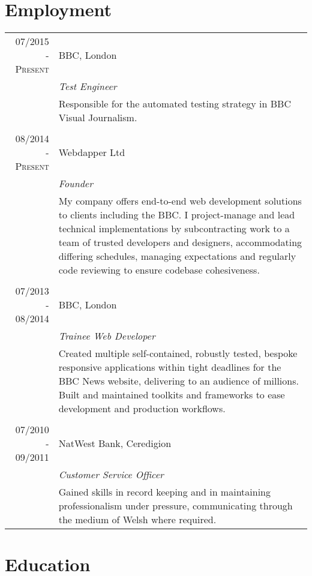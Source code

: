 \documentclass[a4paper,10pt]{article}
\begin{document}
\section{Employment}
\begin{tabular}{r|p{11cm}}
\textsc{07/2015 - Present} & BBC, London
\\&\emph{Test Engineer}
\\&\footnotesize{Responsible for the automated testing strategy in BBC Visual Journalism.}
\\\multicolumn{2}{c}{} \\
\textsc{08/2014 - Present} & Webdapper Ltd
\\&\emph{Founder}
\\&\footnotesize{My company offers end-to-end web development solutions to clients including the BBC. I project-manage and lead technical implementations by subcontracting work to a team of trusted developers and designers, accommodating differing schedules, managing expectations and regularly code reviewing to ensure codebase cohesiveness.}
\\\multicolumn{2}{c}{} \\
\textsc{07/2013 - 08/2014} & BBC, London
\\&\emph{Trainee Web Developer}
\\&\footnotesize{Created multiple self-contained, robustly tested, bespoke responsive applications within tight deadlines for the BBC News website, delivering to an audience of millions. Built and maintained toolkits and frameworks to ease development and production workflows.}
\\\multicolumn{2}{c}{} \\
\textsc{07/2010 - 09/2011} & NatWest Bank, Ceredigion
\\&\emph{Customer Service Officer}
\\&\footnotesize{Gained skills in record keeping and in maintaining professionalism under pressure, communicating through the medium of Welsh where required.}
\end{tabular}

\section{Education}
\end{document}
